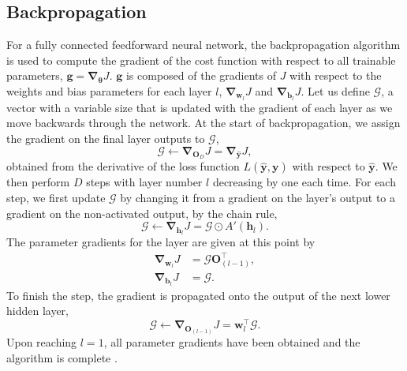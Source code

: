 \documentclass[12pt]{article}
\begin{document}
\subsection{Backpropagation}
For a fully connected feedforward neural network, the backpropagation algorithm is used to compute the gradient of the cost function with respect to all trainable parameters, $\bm{g}=\bm\nabla_{\bm\theta}J$. $\bm{g}$ is composed of the gradients of $J$ with respect to the weights and bias parameters for each layer $l$, $\bm\nabla_{\bm{w}_l}J$ and $\bm\nabla_{\bm{b}_l}J$. Let us define $\bm{\mathcal{G}}$, a vector with a variable size that is updated with the gradient of each layer as we move backwards through the network. At the start of backpropagation, we assign the gradient on the final layer outputs to $\bm{\mathcal{G}}$,
\begin{equation}
\bm{\mathcal{G}}\leftarrow \bm\nabla_{\bm{O}_D}J=\bm\nabla_{\hat{\bm{y}}}J, 
\end{equation} 
obtained from the derivative of the loss function $L(\hat{\bm{y}},\bm{y})$ with respect to $\hat{\bm{y}}$. We then perform $D$ steps with layer number $l$ decreasing by one each time. For each step, we first update $\bm{\mathcal{G}}$ by changing it from a gradient on the layer's output to a gradient on the non-activated output, by the chain rule,
\begin{equation}
\bm{\mathcal{G}}\leftarrow \bm{\nabla}_{\bm{h}_l}J=\bm{\mathcal{G}}\odot A'(\bm{h}_l).
\end{equation}
The parameter gradients for the layer are given at this point by
\begin{align}
\bm\nabla_{\bm{w}_l}J&=\bm{\mathcal{G}}\bm{O}_{(l-1)}^{\top},\\
\bm\nabla_{\bm{b}_l}J&=\bm{\mathcal{G}}.
\end{align}
To finish the step, the gradient is propagated onto the output of the next lower hidden layer,
\begin{equation}
\bm{\mathcal{G}}\leftarrow \bm{\nabla}_{\bm{O}_{(l-1)}}J=\bm{w}_l^{\top}\bm{\mathcal{G}}.
\end{equation}
Upon reaching $l=1$, all parameter gradients have been obtained and the algorithm is complete \cite{Rumelhart86, Goodfellow16}.
\end{document}
